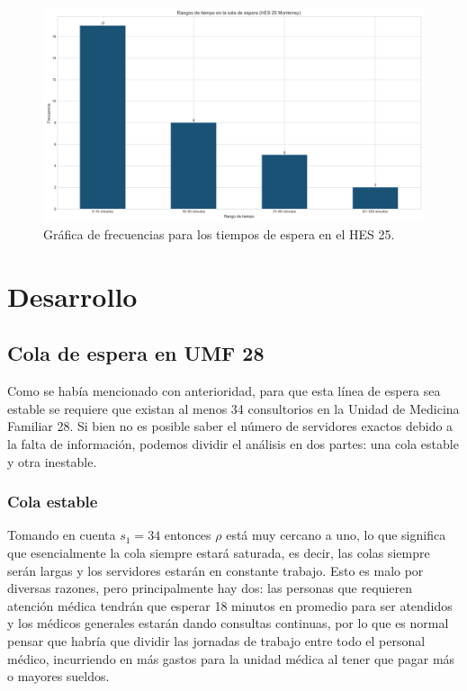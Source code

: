 \documentclass[10pt]{article}
\begin{document}
    \begin{figure}[h]
    	\centering
    	\includegraphics[width=130mm]{./images/rangos-tiempo-espera-hes25.png}
    	\caption{Gráfica de frecuencias para los tiempos de espera en el HES 25.}
    	\label{fig:frec_espera_hes25}
    \end{figure}
    
    \newpage
    
    \section{Desarrollo} \label{sec:desarrollo}
    \subsection{Cola de espera en UMF 28}
    Como se había mencionado con anterioridad, para que esta línea de espera sea estable se requiere que existan al menos 34 consultorios en la Unidad de Medicina Familiar 28. Si bien no es posible saber el número de servidores exactos debido a la falta de información, podemos dividir el análisis en dos partes: una cola estable y otra inestable.
    
    \subsubsection{Cola estable} \label{subsubsec:cola1_estable}
    Tomando en cuenta $s_{1} = 34$ entonces $\rho$ está muy cercano a uno, lo que significa que esencialmente la cola siempre estará saturada, es decir, las colas siempre serán largas y los servidores estarán en constante trabajo. Esto es malo por diversas razones, pero principalmente hay dos: las personas que requieren atención médica tendrán que esperar 18 minutos en promedio para ser atendidos y los médicos generales estarán dando consultas continuas, por lo que es normal pensar que habría que dividir las jornadas de trabajo entre todo el personal médico, incurriendo en más gastos para la unidad médica al tener que pagar más o mayores sueldos. 
    
\end{document}
